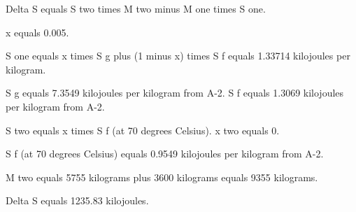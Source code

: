 Delta S equals S two times M two minus M one times S one.  

x equals 0.005.  

S one equals x times S g plus (1 minus x) times S f equals 1.33714 kilojoules per kilogram.  

S g equals 7.3549 kilojoules per kilogram from A-2.  
S f equals 1.3069 kilojoules per kilogram from A-2.  

S two equals x times S f (at 70 degrees Celsius).  
x two equals 0.  

S f (at 70 degrees Celsius) equals 0.9549 kilojoules per kilogram from A-2.  

M two equals 5755 kilograms plus 3600 kilograms equals 9355 kilograms.  

Delta S equals 1235.83 kilojoules.